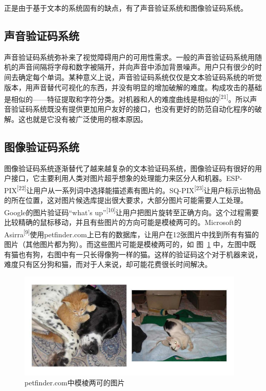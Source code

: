 \documentclass[bachelor,zhspacing]{cqu}  %
\begin{document}
正是由于基于文本的系统固有的缺点，有了声音验证系统和图像验证码系统。

\subsection{声音验证码系统}\label{ux58f0ux97f3ux9a8cux8bc1ux7801ux7cfbux7edf}

声音验证码系统弥补来了视觉障碍用户的可用性需求。一般的声音验证码系统用随机的声音间隔将字母和数字被隔开，并向声音中添加背景噪声。用户只有很少的时间去确定每个单词。某种意义上说，声音验证码系统仅仅是文本验证码系统的听觉版本，用声音替代可视化的东西，并没有明显的增加破解的难度。构成攻击的基础是相似的------特征提取和字符分类。对机器和人的难度曲线是相似的\textsuperscript{{[}21{]}}。所以声音验证码系统既没有提供更加用户友好的接口，也没有更好的防范自动化程序的破解。这也就是它没有被广泛使用的根本原因。

\subsection{图像验证码系统}\label{ux56feux50cfux9a8cux8bc1ux7801ux7cfbux7edf}

图像验证码系统逐渐替代了越来越复杂的文本验证码系统，图像验证码有很好的用户接口，它主要利用人类对图片超乎想象的处理能力来区分人和机器。ESP-PIX\textsuperscript{{[}22{]}}让用户从一系列词中选择能描述素有图片的。SQ-PIX\textsuperscript{{[}23{]}}让用户标示出物品的所在位置，这对图片候选库提出很大要求，大部分图片可能需要人工处理。Google的图片验证码``what's
up''\textsuperscript{{[}10{]}}让用户把图片旋转至正确方向。这个过程需要比较精确的鼠标移动，并且有些图片的方向可能是模棱两可的。Microsoft的Asirra\textsuperscript{{[}9{]}}使用petfinder.com上已有的数据库，让用户在12张图片中找到所有有猫的图片（其他图片都为狗）。而这些图片可能是模棱两可的，如
图~\ref{fig:asirral}
中，左图中既有猫也有狗，右图中有一只长得像狗一样的猫。这样的验证码这个对于机器来说，难度只有区分狗和猫，而对于人来说，却可能花费很长时间解决。

\begin{figure}[htbp]
\centering
\includegraphics{pic/asirral.png}
\caption{petfinder.com中模棱两可的图片}\label{fig:asirral}
\end{figure}
\end{document}
